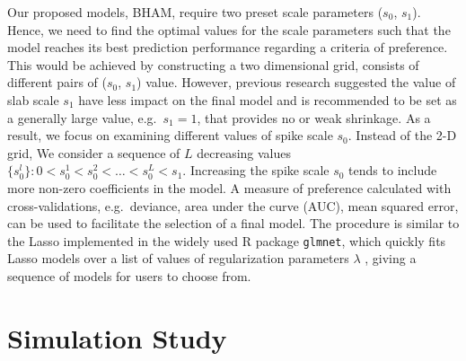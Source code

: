 \documentclass[AMA,STIX1COL,]{WileyNJD-v2}
\begin{document}
\label{sec:tune} Our proposed models, BHAM, require two preset scale
parameters (\(s_0\), \(s_1\)). Hence, we need to find the optimal values
for the scale parameters such that the model reaches its best prediction
performance regarding a criteria of preference. This would be achieved
by constructing a two dimensional grid, consists of different pairs of
(\(s_0\), \(s_1\)) value. However, previous research suggested the value
of slab scale \(s_1\) have less impact on the final model and is
recommended to be set as a generally large value, e.g.~\(s_1 = 1\), that
provides no or weak shrinkage. \citep{Rockova2018} As a result, we focus
on examining different values of spike scale \(s_0\). Instead of the 2-D
grid, We consider a sequence of \(L\) decreasing values
\(\{s_0^l\}: 0 < s_0^1 < s_0^2 < \dots < s_0^L < s_1\). Increasing the
spike scale \(s_0\) tends to include more non-zero coefficients in the
model. A measure of preference calculated with cross-validations,
e.g.~deviance, area under the curve (AUC), mean squared error, can be
used to facilitate the selection of a final model. The procedure is
similar to the Lasso implemented in the widely used R package
\texttt{glmnet}, which quickly fits Lasso models over a list of values
of regularization parameters \(\lambda\) , giving a sequence of models
for users to choose from.

\hypertarget{simulation-study}{%
\section{Simulation Study}\label{simulation-study}}

\label{sec:sim}
\end{document}
